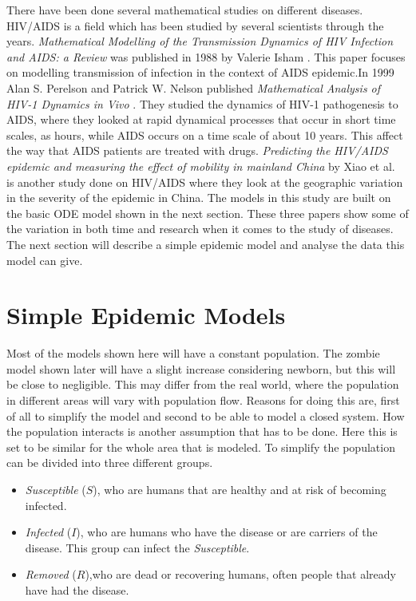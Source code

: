 \documentclass[%
twoside,                 %
final,                   %
10pt]{article}
\begin{document}
There have been done several mathematical studies on different diseases. HIV/AIDS is a field which has been studied by several scientists through the years. \emph{Mathematical Modelling of the Transmission Dynamics of HIV Infection and AIDS: a Review} was published in 1988 by Valerie Isham \cite{isham1988mathematical}. This paper focuses on modelling transmission of infection in the context of AIDS epidemic.In 1999 Alan S. Perelson and Patrick W. Nelson published \emph{Mathematical Analysis of HIV-1 Dynamics in Vivo} \cite{perelson1999mathematical}. They studied the dynamics of HIV-1 pathogenesis to AIDS, where they looked at rapid dynamical processes that occur in short time scales, as hours, while AIDS occurs on a time scale of about 10 years. This affect the way that AIDS patients are treated with drugs. \emph{Predicting the HIV/AIDS epidemic and measuring the effect of mobility in mainland China} by Xiao et al.~\cite{xiao2013predicting} is another study done on HIV/AIDS where they look at the geographic variation in the severity of the epidemic in China. The models in this study are built on the basic ODE model shown in the next section. These three papers show some of the variation in both time and research when it comes to the study of diseases. The next section will describe a simple epidemic model and analyse the data this model can give. 

\section{Simple Epidemic Models}
Most of the models shown here will have a constant population. The zombie model shown later will have a slight increase considering newborn, but this will be close to negligible. This may differ from the real world, where the population in different areas will vary with population flow. Reasons for doing this are, first of all to simplify the model and second to be able to model a closed system. How the population interacts is another assumption that has to be done. Here this is set to be similar for the whole area that is modeled. To simplify the population can be divided into three different groups. 
\begin{itemize}
\item \emph{Susceptible} ($S$), who are humans that are healthy and at risk of becoming infected. 

\item \emph{Infected} ($I$), who are humans who have the disease or are carriers of the disease. This group can infect the \emph{Susceptible}. 

\item \emph{Removed} ($R$),who are dead or recovering humans, often people that already have had the disease. 
\end{itemize}
\end{document}
